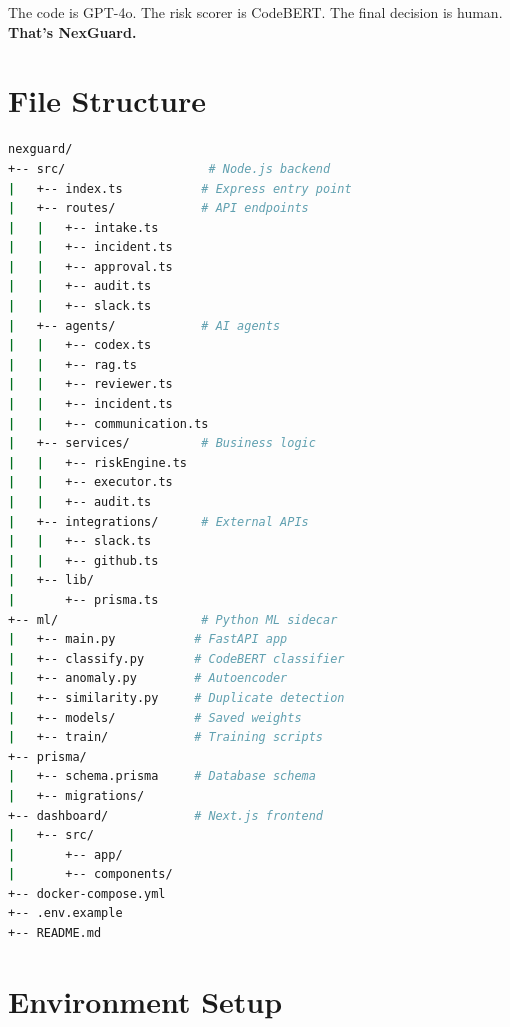 \documentclass[11pt,a4paper]{article}
\begin{document}
The code is GPT-4o. The risk scorer is CodeBERT. The final decision is human. \textbf{That's NexGuard.}


\newpage
\appendix
\section{File Structure}

\begin{lstlisting}[language=bash,caption=Project Directory Tree]
nexguard/
+-- src/                    # Node.js backend
|   +-- index.ts           # Express entry point
|   +-- routes/            # API endpoints
|   |   +-- intake.ts
|   |   +-- incident.ts
|   |   +-- approval.ts
|   |   +-- audit.ts
|   |   +-- slack.ts
|   +-- agents/            # AI agents
|   |   +-- codex.ts
|   |   +-- rag.ts
|   |   +-- reviewer.ts
|   |   +-- incident.ts
|   |   +-- communication.ts
|   +-- services/          # Business logic
|   |   +-- riskEngine.ts
|   |   +-- executor.ts
|   |   +-- audit.ts
|   +-- integrations/      # External APIs
|   |   +-- slack.ts
|   |   +-- github.ts
|   +-- lib/
|       +-- prisma.ts
+-- ml/                    # Python ML sidecar
|   +-- main.py           # FastAPI app
|   +-- classify.py       # CodeBERT classifier
|   +-- anomaly.py        # Autoencoder
|   +-- similarity.py     # Duplicate detection
|   +-- models/           # Saved weights
|   +-- train/            # Training scripts
+-- prisma/
|   +-- schema.prisma     # Database schema
|   +-- migrations/
+-- dashboard/            # Next.js frontend
|   +-- src/
|       +-- app/
|       +-- components/
+-- docker-compose.yml
+-- .env.example
+-- README.md
\end{lstlisting}

\newpage
\section{Environment Setup}
\end{document}
